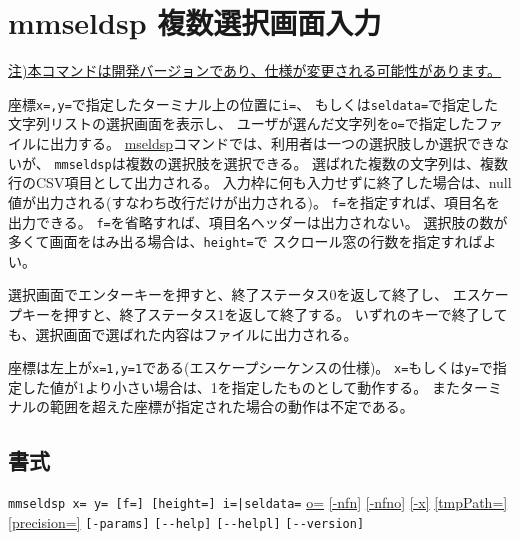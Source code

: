 
%

\section{mmseldsp 複数選択画面入力\label{sect:mmseldsp}}
\underline{注)本コマンドは開発バージョンであり、仕様が変更される可能性があります。}

座標\verb|x=,y=|で指定したターミナル上の位置に\verb|i=|、
もしくは\verb|seldata=|で指定した文字列リストの選択画面を表示し、
ユーザが選んだ文字列を\verb|o=|で指定したファイルに出力する。
\hyperref[sect:mseldsp]{mseldsp}コマンドでは、利用者は一つの選択肢しか選択できないが、
\verb|mmseldsp|は複数の選択肢を選択できる。
選ばれた複数の文字列は、複数行のCSV項目として出力される。
入力枠に何も入力せずに終了した場合は、null値が出力される(すなわち改行だけが出力される)。
\verb|f=|を指定すれば、項目名を出力できる。
\verb|f=|を省略すれば、項目名ヘッダーは出力されない。
選択肢の数が多くて画面をはみ出る場合は、\verb|height=|で
スクロール窓の行数を指定すればよい。

選択画面でエンターキーを押すと、終了ステータス0を返して終了し、
エスケープキーを押すと、終了ステータス1を返して終了する。
いずれのキーで終了しても、選択画面で選ばれた内容はファイルに出力される。

座標は左上が\verb|x=1,y=1|である(エスケープシーケンスの仕様)。
\verb|x=|もしくは\verb|y=|で指定した値が1より小さい場合は、1を指定したものとして動作する。
またターミナルの範囲を超えた座標が指定された場合の動作は不定である。


\subsection*{書式}
\verb/mmseldsp x= y= [f=] [height=] i=|seldata=/
\hyperref[sect:option_o]{o=}
\hyperref[sect:option_nfn]{[-nfn]} 
\hyperref[sect:option_nfno]{[-nfno]}  
\hyperref[sect:option_x]{[-x]}
\hyperref[sect:option_option_tmppath]{[tmpPath=]}
\hyperref[sect:option_precision]{[precision=]}
\verb|[-params]|
\verb|[--help]|
\verb|[--helpl]|
\verb|[--version]|\\

